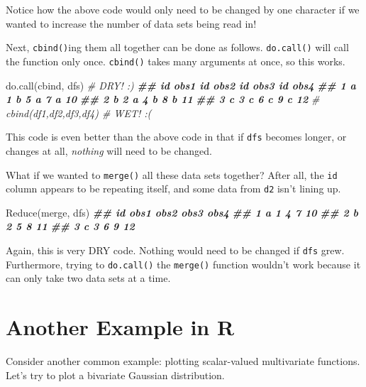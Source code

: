 \documentclass[
  12pt,
]{krantz}
\makeatletter
\newenvironment{Shaded}{\begin{snugshade}}{\end{snugshade}}
\newcommand{\CommentTok}[1]{\textcolor[rgb]{0.37,0.37,0.37}{\textit{#1}}}
\newcommand{\DocumentationTok}[1]{\textcolor[rgb]{0.37,0.37,0.37}{\textbf{\textit{#1}}}}
\newcommand{\FunctionTok}[1]{\textcolor[rgb]{0,0,0}{#1}}
\newcommand{\NormalTok}[1]{#1}
\newenvironment{kframe}{%
\medskip{}
\setlength{\fboxsep}{.8em}
 \def\at@end@of@kframe{}%
 \ifinner\ifhmode%
  \def\at@end@of@kframe{\end{minipage}}%
  \begin{minipage}{\columnwidth}%
 \fi\fi%
 \def\FrameCommand##1{\hskip\@totalleftmargin \hskip-\fboxsep
 \colorbox{shadecolor}{##1}\hskip-\fboxsep
     \hskip-\linewidth \hskip-\@totalleftmargin \hskip\columnwidth}%
 \MakeFramed {\advance\hsize-\width
   \@totalleftmargin\z@ \linewidth\hsize
   \@setminipage}}%
 {\par\unskip\endMakeFramed%
 \at@end@of@kframe}
\renewenvironment{Shaded}{\begin{kframe}}{\end{kframe}}
\makeatother
\begin{document}
Notice how the above code would only need to be changed by one character if we wanted to increase the number of data sets being read in!

Next, \texttt{cbind()}ing them all together can be done as follows. \texttt{do.call()} will call the function only once. \texttt{cbind()} takes many arguments at once, so this works.

\begin{Shaded}
\begin{Highlighting}[]
\FunctionTok{do.call}\NormalTok{(cbind, dfs) }\CommentTok{\# DRY! :)}
\DocumentationTok{\#\#   id obs1 id obs2 id obs3 id obs4}
\DocumentationTok{\#\# 1  a    1  b    5  a    7  a   10}
\DocumentationTok{\#\# 2  b    2  a    4  b    8  b   11}
\DocumentationTok{\#\# 3  c    3  c    6  c    9  c   12}
\CommentTok{\# cbind(df1,df2,df3,df4) \# WET! :(}
\end{Highlighting}
\end{Shaded}

This code is even better than the above code in that if \texttt{dfs} becomes longer, or changes at all, \emph{nothing} will need to be changed.

What if we wanted to \texttt{merge()} all these data sets together? After all, the \texttt{id} column appears to be repeating itself, and some data from \texttt{d2} isn't lining up.

\begin{Shaded}
\begin{Highlighting}[]
\FunctionTok{Reduce}\NormalTok{(merge, dfs)}
\DocumentationTok{\#\#   id obs1 obs2 obs3 obs4}
\DocumentationTok{\#\# 1  a    1    4    7   10}
\DocumentationTok{\#\# 2  b    2    5    8   11}
\DocumentationTok{\#\# 3  c    3    6    9   12}
\end{Highlighting}
\end{Shaded}

Again, this is very DRY code. Nothing would need to be changed if \texttt{dfs} grew. Furthermore, trying to \texttt{do.call()} the \texttt{merge()} function wouldn't work because it can only take two data sets at a time.

\hypertarget{another-example-in-r}{%
\section{Another Example in R}\label{another-example-in-r}}

Consider another common example: plotting scalar-valued multivariate functions. Let's try to plot a bivariate Gaussian distribution.
\end{document}
